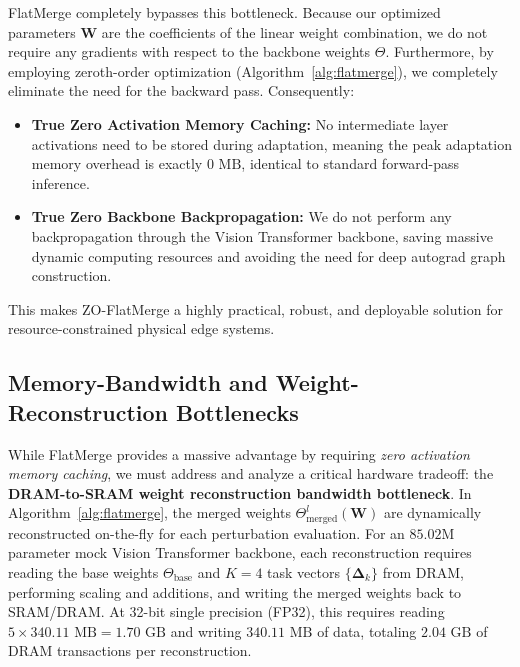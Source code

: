 FlatMerge completely bypasses this bottleneck. 
Because our optimized parameters $\mathbf{W}$ are the coefficients of the linear weight combination, we do not require any gradients with respect to the backbone weights $\Theta$. 
Furthermore, by employing zeroth-order optimization (Algorithm~\ref{alg:flatmerge}), we completely eliminate the need for the backward pass. 
Consequently:
\begin{itemize}
    \item \textbf{True Zero Activation Memory Caching:} No intermediate layer activations need to be stored during adaptation, meaning the peak adaptation memory overhead is exactly $0\text{ MB}$, identical to standard forward-pass inference.
    \item \textbf{True Zero Backbone Backpropagation:} We do not perform any backpropagation through the Vision Transformer backbone, saving massive dynamic computing resources and avoiding the need for deep autograd graph construction.
\end{itemize}
This makes ZO-FlatMerge a highly practical, robust, and deployable solution for resource-constrained physical edge systems.

\subsection{Memory-Bandwidth and Weight-Reconstruction Bottlenecks}
\label{sec:bandwidth}
While FlatMerge provides a massive advantage by requiring \emph{zero activation memory caching}, we must address and analyze a critical hardware tradeoff: the \textbf{DRAM-to-SRAM weight reconstruction bandwidth bottleneck}. 
In Algorithm~\ref{alg:flatmerge}, the merged weights $\Theta^l_{\text{merged}}(\mathbf{W})$ are dynamically reconstructed on-the-fly for each perturbation evaluation. 
For an $85.02$M parameter mock Vision Transformer backbone, each reconstruction requires reading the base weights $\Theta_{\text{base}}$ and $K=4$ task vectors $\{\mathbf{\Delta}_k\}$ from DRAM, performing scaling and additions, and writing the merged weights back to SRAM/DRAM. 
At 32-bit single precision (FP32), this requires reading $5 \times 340.11\text{ MB} = 1.70\text{ GB}$ and writing $340.11\text{ MB}$ of data, totaling $2.04\text{ GB}$ of DRAM transactions per reconstruction.

